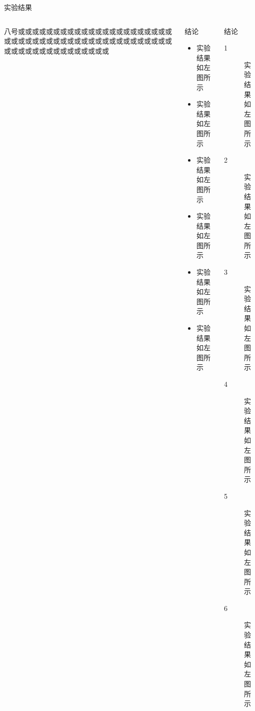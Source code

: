 \documentclass[8pt,compress,t,noamsthm,notheorem,handout,table]{beamer}
\theoremstyle{nonumberplain}%
\theoremstyle{plain}
\begin{document}
\begin{frame}{实验结果}
\begin{columns}[c]
	\begin{column}{0.30\textwidth}
		八号或或或或或或或或或或或或或或或或或或或或或或或或或或或或或或或或或或或或或或或或或或或或或或或或或或或或或或或或或或或或或
	\end{column}
	\begin{column}{0.30\textwidth}
		\begin{Block}{结论}
			\begin{itemize}
				\item 实验结果如左图所示
				\item 实验结果如左图所示
				\item 实验结果如左图所示
				\item 实验结果如左图所示
				\item 实验结果如左图所示
				\item 实验结果如左图所示
			\end{itemize}
		\end{Block}
	\end{column}

	\begin{column}{0.30\textwidth}
	\begin{block}{结论}
		\begin{description}
			\item[1] 实验结果如左图所示
			\item[2] 实验结果如左图所示
			\item[3] 实验结果如左图所示
			\item[4] 实验结果如左图所示
			\item[5] 实验结果如左图所示
			\item[6] 实验结果如左图所示
		\end{description}
	\end{block}
\end{column}
\end{columns}
\end{frame}
\end{document}
